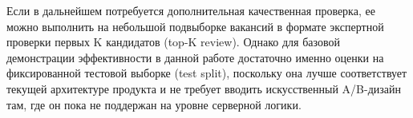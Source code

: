 Если в дальнейшем потребуется дополнительная качественная проверка, ее можно выполнить на небольшой подвыборке вакансий в формате экспертной проверки первых K кандидатов (top-K review). Однако для базовой демонстрации эффективности в данной работе достаточно именно оценки на фиксированной тестовой выборке (test split), поскольку она лучше соответствует текущей архитектуре продукта и не требует вводить искусственный A/B-дизайн там, где он пока не поддержан на уровне серверной логики.
